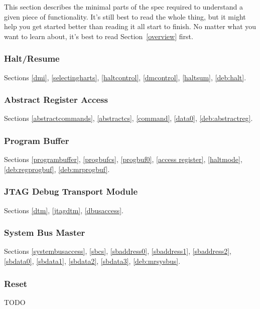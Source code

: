 \documentclass{article}
\begin{document}
This section describes the minimal parts of the spec required to understand a
given piece of functionality. It's still best to read the whole thing, but it
might help you get started better than reading it all start to finish. No
matter what you want to learn about, it's best to read Section~\ref{overview}
first.

\subsubsection{Halt/Resume}

Sections \ref{dmi}, \ref{selectingharts}, \ref{haltcontrol}, \ref{dmcontrol},
\ref{haltsum}, \ref{deb:halt}.

\subsubsection{Abstract Register Access}

Sections \ref{abstractcommands}, \ref{abstractcs}, \ref{command},
\ref{data0}, \ref{deb:abstractreg}.

\subsubsection{Program Buffer}

Sections \ref{programbuffer}, \ref{progbufcs}, \ref{progbuf0}, \ref{access
register}, \ref{haltmode}, \ref{deb:regprogbuf}, \ref{deb:mrprogbuf}.

\subsubsection{JTAG Debug Transport Module}

Sections \ref{dtm}, \ref{jtagdtm}, \ref{dbusaccess}.

\subsubsection{System Bus Master}

Sections \ref{systembusaccess}, \ref{sbcs}, \ref{sbaddress0}, \ref{sbaddress1},
\ref{sbaddress2}, \ref{sbdata0}, \ref{sbdata1}, \ref{sbdata2}, \ref{sbdata3},
\ref{deb:mrsysbus}.

\subsubsection{Reset}

TODO
\end{document}
